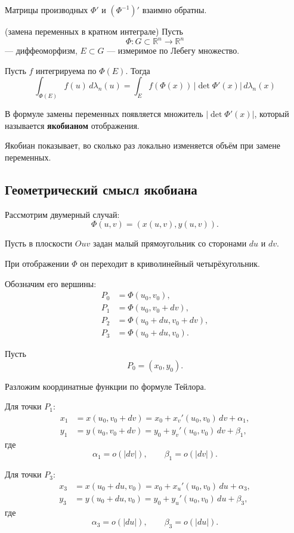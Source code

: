 \documentclass[12pt,a4paper]{article}
\begin{document}
Матрицы производных $\Phi'$ и $(\Phi^{-1})'$ взаимно обратны.

\begin{theorem}{(замена переменных в кратном интеграле)}
Пусть
\[
\Phi:G\subset\mathbb{R}^n\to\mathbb{R}^n
\]
— диффеоморфизм, $E\subset G$ — измеримое по Лебегу множество.

Пусть $f$ интегрируема по $\Phi(E)$. Тогда
\[
\int_{\Phi(E)}f(u)\,d\lambda_n(u)
=
\int_E
f(\Phi(x))\,|\det\Phi'(x)|\,d\lambda_n(x)
\]
\end{theorem}

\begin{note}
В формуле замены переменных появляется множитель $|\det\Phi'(x)|$, который называется \textbf{якобианом} отображения.

Якобиан показывает, во сколько раз локально изменяется объём при замене переменных.
\end{note}

\subsection{Геометрический смысл якобиана}

Рассмотрим двумерный случай:
\[
\Phi(u,v)=(x(u,v),y(u,v)).
\]

Пусть в плоскости $Ouv$ задан малый прямоугольник со сторонами $du$ и $dv$.

При отображении $\Phi$ он переходит в криволинейный четырёхугольник.

Обозначим его вершины:
\[
\begin{aligned}
P_0&=\Phi(u_0,v_0),\\
P_1&=\Phi(u_0,v_0+dv),\\
P_2&=\Phi(u_0+du,v_0+dv),\\
P_3&=\Phi(u_0+du,v_0).
\end{aligned}
\]

Пусть
\[
P_0=(x_0,y_0).
\]

Разложим координатные функции по формуле Тейлора.

Для точки $P_1$:
\[
\begin{aligned}
x_1&=x(u_0,v_0+dv)
=x_0+x_v'(u_0,v_0)\,dv+\alpha_1,\\
y_1&=y(u_0,v_0+dv)
=y_0+y_v'(u_0,v_0)\,dv+\beta_1,
\end{aligned}
\]
где
\[
\alpha_1=o(|dv|),\qquad
\beta_1=o(|dv|).
\]

Для точки $P_3$:
\[
\begin{aligned}
x_3&=x(u_0+du,v_0)
=x_0+x_u'(u_0,v_0)\,du+\alpha_3,\\
y_3&=y(u_0+du,v_0)
=y_0+y_u'(u_0,v_0)\,du+\beta_3,
\end{aligned}
\]
где
\[
\alpha_3=o(|du|),\qquad
\beta_3=o(|du|).
\]
\end{document}
